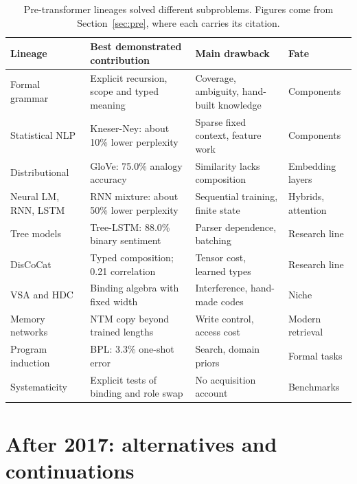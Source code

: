 \begin{table}[ht]
\centering\small
\begin{tabular}{p{3.0cm}p{4.3cm}p{3.6cm}p{2.4cm}}
\toprule
Lineage & Best demonstrated contribution & Main drawback & Fate \\
\midrule
Formal grammar & Explicit recursion, scope and typed meaning & Coverage, ambiguity, hand-built knowledge & Components \\
Statistical NLP & Kneser-Ney: about 10\% lower perplexity & Sparse fixed context, feature work & Components \\
Distributional & GloVe: 75.0\% analogy accuracy & Similarity lacks composition & Embedding layers \\
Neural LM, RNN, LSTM & RNN mixture: about 50\% lower perplexity & Sequential training, finite state & Hybrids, attention \\
Tree models & Tree-LSTM: 88.0\% binary sentiment & Parser dependence, batching & Research line \\
DisCoCat & Typed composition; 0.21 correlation & Tensor cost, learned types & Research line \\
VSA and HDC & Binding algebra with fixed width & Interference, hand-made codes & Niche \\
Memory networks & NTM copy beyond trained lengths & Write control, access cost & Modern retrieval \\
Program induction & BPL: 3.3\% one-shot error & Search, domain priors & Formal tasks \\
Systematicity & Explicit tests of binding and role swap & No acquisition account & Benchmarks \\
\bottomrule
\end{tabular}
\caption{Pre-transformer lineages solved different subproblems. Figures come from Section~\ref{sec:pre}, where each carries its citation.}
\label{tab:pre}
\end{table}

\section{After 2017: alternatives and continuations}
\label{sec:post}

